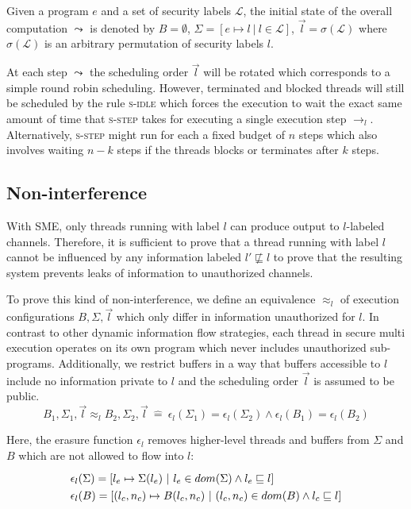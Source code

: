 \documentclass[10pt,preprint]{sigplanconf}
\newcommand{\arrayStretch}{1.28}
\begin{document}
Given a program $e$ and a set of security labels $\mathcal{L}$, the initial state of the overall computation $\leadsto$ is denoted by $B = \emptyset$, $\Sigma = [e \mapsto l ~|~ l \in \mathcal{L}]$, $\vec{l} = \sigma(\mathcal{L})$ where $\sigma(\mathcal{L})$ is an arbitrary permutation of security labels $l$.

At each step $\leadsto$ the scheduling order $\vec{l}$ will be rotated which corresponds to a simple round robin scheduling.  However, terminated and blocked threads will still be scheduled by the rule \textsc{s-idle} which forces the execution to wait the exact same amount of time that \textsc{s-step} takes for executing a single execution step $\rightarrow_l$.  Alternatively, \textsc{s-step} might run for each a fixed budget of $n$ steps which also involves waiting $n-k$ steps if the threads blocks or terminates after $k$ steps.

\subsection{Non-interference}

With SME, only threads running with label $l$ can produce output to $l$-labeled channels.  Therefore, it is sufficient to prove that a thread running with label $l$ cannot be influenced by any information labeled $l' \not \sqsubseteq l$ to prove that the resulting system prevents leaks of information to unauthorized channels.

To prove this kind of non-interference, we define an equivalence  $\approx_l$ of execution configurations $B,\Sigma,\vec{l}$ which only differ in information unauthorized for $l$.  In contrast to other dynamic information flow strategies, each thread in secure multi execution operates on its own program which never includes unauthorized sub-programs.  Additionally, we restrict buffers in a way that buffers accessible to $l$ include no information private to $l$ and the scheduling order $\vec{l}$ is assumed to be public.
\[ B_1,\Sigma_1, \vec{l} \approx_l B_2,\Sigma_2, \vec{l}~\hat{=}~ \epsilon_l(\Sigma_1) = \epsilon_l(\Sigma_2) \wedge \epsilon_l(B_1) = \epsilon_l(B_2) \]

Here, the erasure function $\epsilon_{l}$ removes higher-level threads and buffers from $\Sigma$ and $B$ which are not allowed to flow into $l$:
\[\arraycolsep=1.6pt\def\arraystretch{\arrayStretch}
\begin{array}{lr}
  \epsilon_{l}(\Sigma) = [ l_e \mapsto \Sigma(l_e) ~|~ l_e \in dom(\Sigma) \wedge l_e \sqsubseteq l ] \\
  \epsilon_{l}(B) = [ (l_c, n_c) \mapsto B(l_c, n_c) ~|~ (l_c, n_c) \in dom(B) \wedge l_c \sqsubseteq l ]
\end{array} \]
\end{document}
